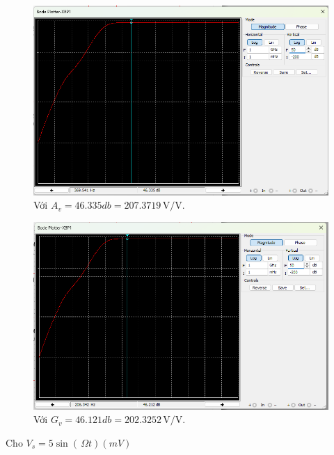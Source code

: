 \begin{figure}[H]
	\centering
	\includegraphics[width=.8\linewidth]{./my-chapters/my-images/Question6/b_bode_A_v.png}
	\caption{Với $A_{v} = 46.335db = 207.3719\,\text{V/V}$.}
\end{figure}

\begin{figure}[H]
	\centering
	\includegraphics[width=.8\linewidth]{./my-chapters/my-images/Question6/b_bode_G_v.png}
	\caption{Với $G_{v} = 46.121db = 202.3252\,\text{V/V}$.}
\end{figure}


\noindent Cho $V_{s} = 5\sin\left(\,\Omega t\right) (mV)$

